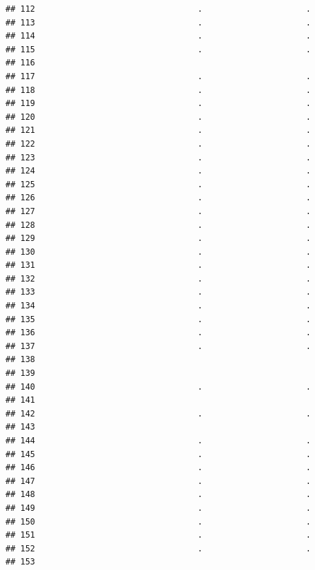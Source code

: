 \documentclass[
]{article}
\begin{document}
\begin{verbatim}
## 112                                 .                     .
## 113                                 .                     .
## 114                                 .                     .
## 115                                 .                     .
## 116                                                        
## 117                                 .                     .
## 118                                 .                     .
## 119                                 .                     .
## 120                                 .                     .
## 121                                 .                     .
## 122                                 .                     .
## 123                                 .                     .
## 124                                 .                     .
## 125                                 .                     .
## 126                                 .                     .
## 127                                 .                     .
## 128                                 .                     .
## 129                                 .                     .
## 130                                 .                     .
## 131                                 .                     .
## 132                                 .                     .
## 133                                 .                     .
## 134                                 .                     .
## 135                                 .                     .
## 136                                 .                     .
## 137                                 .                     .
## 138                                                        
## 139                                                        
## 140                                 .                     .
## 141                                                        
## 142                                 .                     .
## 143                                                        
## 144                                 .                     .
## 145                                 .                     .
## 146                                 .                     .
## 147                                 .                     .
## 148                                 .                     .
## 149                                 .                     .
## 150                                 .                     .
## 151                                 .                     .
## 152                                 .                     .
## 153                                                        

\end{verbatim}
\end{document}
